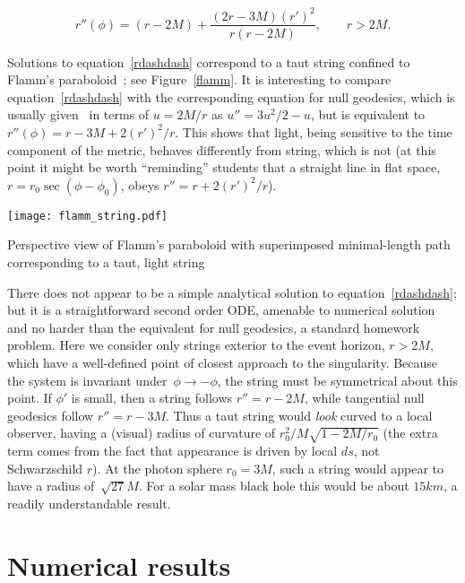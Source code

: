 \documentclass{ws-tpe}
\begin{document}
\begin{equation}\label{rdashdash}
  r''\left(\phi\right) =
  (r-2M) + \frac{(2r-3M)\left(r'\right)^2}{r\left(r-2M\right)},\qquad r>2M.
\end{equation}

\noindent Solutions to equation~\ref{rdashdash} correspond to a taut
string confined to Flamm's paraboloid~\cite{flamm1916}; see
Figure~\ref{flamm}.  It is interesting to compare
equation~\ref{rdashdash} with the corresponding equation for null
geodesics, which is usually given~\cite{wald} in terms of $u=2M/r$ as
$u''=3u^2/2-u$, but is equivalent
to~$r''\left(\phi\right)=r-3M+2\left(r'\right)^2/r$.  This shows that
light, being sensitive to the time component of the metric, behaves
differently from string, which is not (at this point it might be worth
``reminding'' students that a straight line in flat space,
$r=r_0\sec\left(\phi-\phi_0\right)$, obeys
$r''=r+2\left(r'\right)^2/r$).

\begin{figurehere} %
\centering
\texttt{[image: flamm\_string.pdf]}
\caption{Perspective view of Flamm's paraboloid with superimposed minimal-length
  path corresponding to a taut, light string}
\label{flamm}
\end{figurehere}

There does not appear to be a simple analytical solution to
equation~\ref{rdashdash}; but it is a straightforward second order
ODE, amenable to numerical solution and no harder than the equivalent
for null geodesics, a standard homework problem.  Here we consider
only strings exterior to the event horizon, $r>2M$, which have a
well-defined point of closest approach to the singularity.  Because
the system is invariant under~$\phi\longrightarrow-\phi$, the string
must be symmetrical about this point.  If $\phi'$ is small, then a
string follows $r''=r-2M$, while tangential null geodesics follow
$r''=r-3M$.  Thus a taut string would {\em look} curved to a local
observer, having a (visual) radius of curvature of
$r_0^2/M\sqrt{1-2M/r_0}$ (the extra term comes from the fact that
appearance is driven by local $ds$, not Schwarzschild $r$).  At the
photon sphere $r_0=3M$, such a string would appear to have a radius
of~$\sqrt{27}M$.  For a solar mass black hole this would be about
$15\unit{km}$, a readily understandable result.


\section{Numerical results}
\end{document}
